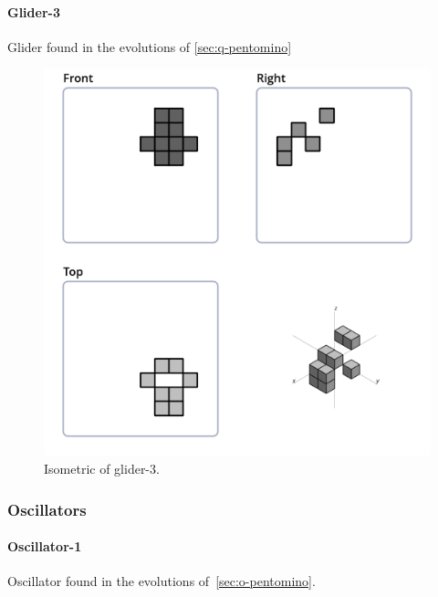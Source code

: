 \paragraph{Glider-3}
Glider found in the evolutions of \ref{sec:q-pentomino}
\begin{figure}
  \centering
  \includegraphics[scale=0.3]{iso_settings/glider_3.png}
  \caption{Isometric of glider-3.}
  \label{fig:iso-glider-3}
\end{figure}


\subsubsection{Oscillators}

\paragraph{Oscillator-1}
Oscillator found in the evolutions of~\ref{sec:o-pentomino}.

